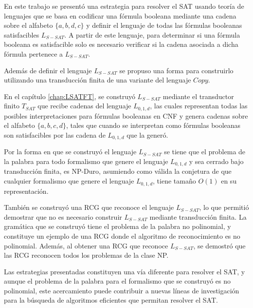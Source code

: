 \begin{conclusionsAndRecomendations}

    En este trabajo se presentó una estrategia para resolver el SAT usando teoría de lenguajes que se basa en 
    codificar una fórmula booleana mediante una cadena sobre el alfabeto $\{a,b,d,c\}$ y definir el lenguaje de 
    todas las fórmulas booleanas satisfacibles $L_{S-SAT}$. A partir de este lenguaje, para determinar si una 
    fórmula booleana es satisfacible solo es necesario verificar si la cadena asociada a dicha fórmula pertenece 
    a $L_{S-SAT}$.
    
    Además de definir el lenguaje $L_{S-SAT}$ se propuso una forma para construirlo utilizando una transducción 
    finita de una variante del lenguaje $Copy$. 
    
    En el capítulo \ref{chap:LSATFT}, se construyó $L_{S-SAT}$ mediante el transductor finito $T_{SAT}$ que 
    recibe cadenas del lenguaje $L_{0,1,d}$, las cuales representan todas las posibles interpretaciones para 
    fórmulas booleanas en CNF y genera cadenas sobre el alfabeto $\{a,b,c,d\}$, tales que cuando se interpretan 
    como fórmulas booleanas son satisfacibles por las cadena de $L_{0,1,d}$ que la generó. 
    
    Por la forma en que se construyó el lenguaje $L_{S-SAT}$ se tiene que el problema de la palabra para todo 
    formalismo que genere el lenguaje $L_{0,1,d}$ y sea cerrado bajo transducción finita, es NP-Duro, asumiendo como válida 
    la conjetura de que cualquier formalismo que genere el lenguaje $L_{0,1,d}$, tiene tamaño $O(1)$ en su 
    representación.
    
    También se construyó una RCG que reconoce el lenguaje $L_{S-SAT}$, lo que permitió demostrar que no es 
    necesario construir $L_{S-SAT}$ mediante transducción finita. La gramática que se construyó tiene el 
    problema de la palabra no polinomial, y constituye un ejemplo de una RCG donde el algoritmo de reconocimiento 
    es no polinomial.  Además, al obtener una RCG que reconoce $L_{S-SAT}$, se demostró que las 
    RCG reconocen todos los problemas de la clase NP.
    
    Las estrategias presentadas constituyen una vía diferente para resolver el SAT, y aunque el problema de 
    la palabra para el formalismo que se construyó es no polinomial, este acercamiento puede contribuir a nuevas 
    líneas de investigación para la búsqueda de algoritmos eficientes que permitan resolver el SAT.
    

\end{conclusionsAndRecomendations}
